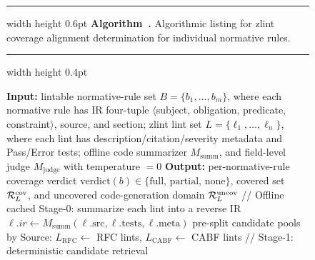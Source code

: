 %
\begin{figure}[!htbp]
\raggedright
\setlength{\parskip}{0pt}
\makeatletter
{}%
\makeatother
{}
\label{alg:coverage}
\hrule width \linewidth height 0.6pt\relax
\nointerlineskip
\noindent\textbf{Algorithm~\thealgorithm.} Algorithmic listing for zlint
coverage alignment determination for individual normative rules.
\par
\nointerlineskip
\hrule width \linewidth height 0.4pt\relax
\nointerlineskip
\scriptsize
\begin{algorithmic}[1]
\Statex \textbf{Input:} lintable normative-rule set $B=\{b_1,\dots,b_m\}$, where each normative rule has
  IR four-tuple $\langle$subject, obligation, predicate, constraint$\rangle$,
  source, and section; zlint lint set $L=\{\ell_1,\dots,\ell_n\}$, where each lint has
  description/citation/severity metadata and Pass/Error tests; offline code
  summarizer $M_{\mathrm{summ}}$, and field-level judge $M_{\mathrm{judge}}$
  with temperature $=0$
\Statex \textbf{Output:} per-normative-rule coverage verdict $\mathrm{verdict}(b)\in\{\text{full, partial,
  none}\}$, covered set $\mathcal{R}_L^{\mathrm{cov}}$, and uncovered code-generation domain $\mathcal{R}_L^{\mathrm{uncov}}$
\Statex // Offline cached Stage-0: summarize each lint into a reverse
  IR
  \State $\ell.\mathit{ir} \gets M_{\mathrm{summ}}(\ell.\mathrm{src},
    \ell.\mathrm{tests}, \ell.\mathrm{meta})$
  \Statex {}
\EndFor
\State pre-split candidate pools by Source: $L_{\mathrm{RFC}}\gets$ RFC lints,\;
  $L_{\mathrm{CABF}}\gets$ CABF lints
  \State // Stage-1: deterministic candidate retrieval
    \Statex \hspace{\algorithmicindent}

\end{algorithmic}
\end{figure}
